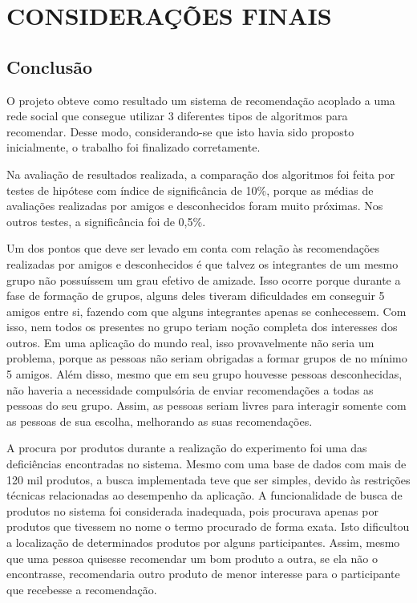 \chapter{CONSIDERAÇÕES FINAIS} %
\label{cha:consideracoes_finais}

\section{Conclusão}
\label{conclusao}

 O projeto obteve como resultado um sistema de recomendação acoplado a uma rede social que consegue utilizar 3 diferentes tipos de algoritmos para recomendar. Desse modo, considerando-se que isto havia sido proposto inicialmente, o trabalho foi finalizado corretamente.

 Na avaliação de resultados realizada, a comparação dos algoritmos foi feita por testes de hipótese com índice de significância de 10\%, porque as médias de avaliações realizadas por amigos e desconhecidos foram muito próximas. Nos outros testes, a significância foi de 0,5\%.

  Um dos pontos que deve ser levado em conta com relação às recomendações realizadas por amigos e desconhecidos é que talvez os integrantes de um mesmo grupo não possuíssem um grau efetivo de amizade. Isso ocorre porque durante a fase de formação de grupos, alguns deles tiveram dificuldades em conseguir 5 amigos entre si, fazendo com que alguns integrantes apenas se conhecessem. Com isso, nem todos os presentes no grupo teriam noção completa dos interesses dos outros. Em uma aplicação do mundo real, isso provavelmente não seria um problema, porque as pessoas não seriam obrigadas a formar grupos de no mínimo 5 amigos. Além disso, mesmo que em seu grupo houvesse pessoas desconhecidas, não haveria a necessidade compulsória de enviar recomendações a todas as pessoas do seu grupo. Assim, as pessoas seriam livres para interagir somente com as pessoas de sua escolha, melhorando as suas recomendações.

  A procura por produtos durante a realização do experimento foi uma das deficiências encontradas no sistema. Mesmo com uma base de dados com mais de 120 mil produtos, a busca implementada teve que ser simples, devido às restrições técnicas relacionadas ao desempenho da aplicação. A funcionalidade de busca de produtos no sistema foi considerada inadequada, pois procurava apenas por produtos que tivessem no nome o termo procurado de forma exata. Isto dificultou a localização de determinados produtos por alguns participantes. Assim, mesmo que uma pessoa quisesse recomendar um bom produto a outra, se ela não o encontrasse, recomendaria outro produto de menor interesse para o participante que recebesse a recomendação.

